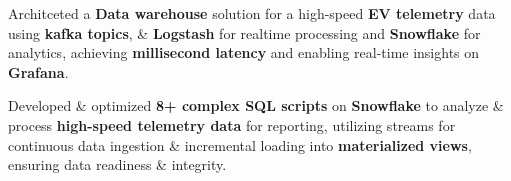 \documentclass[letterpaper,6pt]{article}
\newcommand{\resumeItem}[1]{
  \item\footnotesize{
    {#1 \vspace{-2pt}}
  }
}
\begin{document}
            \resumeItem{Architceted a \textbf{Data warehouse} solution for a high-speed \textbf{EV telemetry} data using \textbf{kafka topics}, \& \textbf{Logstash} for realtime processing and \textbf{Snowflake} for analytics, achieving \textbf{millisecond latency} and enabling real-time insights on \textbf{Grafana}.}

            \resumeItem{Developed \& optimized \textbf{8+ complex SQL scripts} on \textbf{Snowflake} to analyze \& process \textbf{high-speed telemetry data} for reporting, utilizing streams for continuous data ingestion \& incremental loading into \textbf{materialized views}, ensuring data readiness \& integrity.}






\end{document}
